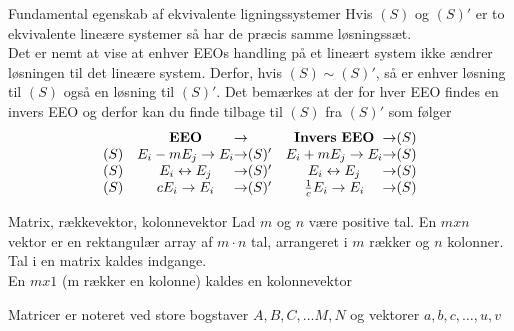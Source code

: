 \documentclass[a4paper,fleqn]{article}
\begin{document}
	\begin{theorem}{Fundamental egenskab af ekvivalente ligningssystemer}
		Hvis $(S)$ og $(S)'$ er to ekvivalente lineære systemer så har de præcis samme
		løsningssæt.\\

		Det er nemt at vise at enhver EEOs handling på et lineært system ikke ændrer
		løsningen til det lineære system. Derfor, hvis $(S)\sim(S)'$, så er enhver
		løsning til $(S)$ også en løsning til $(S)'$. Det bemærkes at der for hver EEO
		findes en invers EEO og derfor kan du finde tilbage til $(S)$ fra $(S)'$ som
		følger
		\[
			\begin{array}{rc @{\rightarrow} r c @{\rightarrow} l}
			& \mathbf{EEO} & & \mathbf{Invers\ EEO} & (S)\\
			(S) & E_i-mE_j \rightarrow E_i & (S)'&E_i + mE_j \rightarrow E_i &(S)\\
			(S) & E_i \leftrightarrow E_j & (S)'&E_i \leftrightarrow E_j &(S)\\
			(S) & cE_i \rightarrow E_i & (S)'& \frac{1}{c}E_i \rightarrow E_i &(S)\\
			\end{array}
		\]
	\end{theorem}
	\begin{definition}{Matrix, rækkevektor, kolonnevektor}{}
		Lad $m$ og $n$ være positive tal. En $m x n$ vektor er en rektangulær array
		af $m\cdot n$ tal, arrangeret i $m$ rækker og $n$ kolonner. Tal i en matrix kaldes
		indgange.\\
		En $m x 1$ (m rækker en kolonne) kaldes en kolonnevektor
	\end{definition}
	Matricer er noteret ved store bogstaver $A, B, C,\dots M, N$ og vektorer $a,b,c,\dots,u,v$
\end{document}
